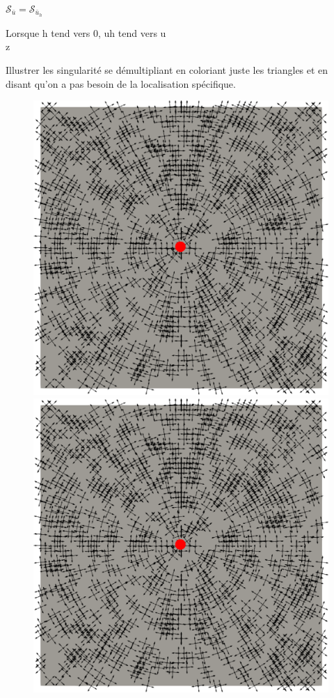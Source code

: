 \begin{lemma}
    $\mathcal{S}_{\bar{u}}=\mathcal{S}_{\bar{u}_h}$
\end{lemma}

Lorsque h tend vers 0, uh tend vers u\\z


Illustrer les singularité se démultipliant  en coloriant juste les triangles et en disant qu'on a pas besoin de la localisation spécifique.\\

\begin{figure}[!h]
  \centering
  \includegraphics[scale=0.27]{images/u_sing.pdf}\hspace{0.2cm}
  \includegraphics[scale=0.27]{images/u_sing.pdf}

\end{figure}
